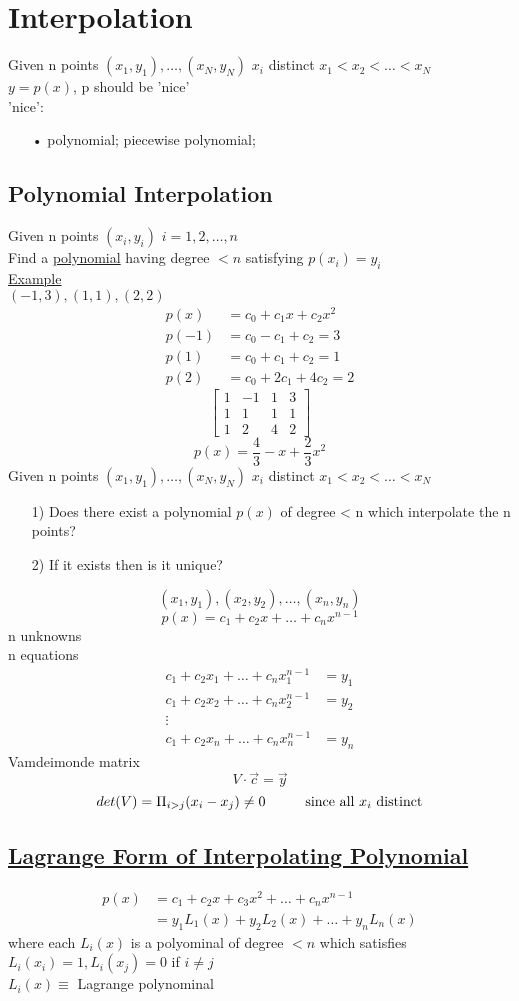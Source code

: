\documentclass[10pt,usletter]{article}
\newcommand{\tab}[1][1cm]{\hspace*{#1}}
\begin{document}
\section{Interpolation}
Given n points $(x_1, y_1),\hdots, (x_N, y_N)$ $x_i$ distinct $x_1<x_2<\hdots<x_N$ \\
$y=p(x)$, p should be 'nice'\\
'nice':
\begin{enumerate}
\item[•] polynomial; piecewise polynomial;
\end{enumerate}
\subsection{Polynomial Interpolation}
Given n points $(x_i, y_i)$  $i=1,2,\hdots,n$\\
Find a \underline{polynomial} having degree $<n$ satisfying $p(x_i)=y_i$\\
\underline{Example}\\
$(-1,3),(1,1), (2,2)$\\
\begin{align*}
p(x)&=c_0+c_1x+c_2x^2\\
p(-1)&=c_0-c_1+c_2=3\\
p(1)&=c_0+c_1+c_2=1\\
p(2)&=c_0+2c_1+4c_2=2
\end{align*}
$$
\begin{bmatrix}
1 & -1 & 1 & 3\\
1 & 1 & 1 & 1\\
1 & 2 & 4 & 2
\end{bmatrix}
$$
$$p(x)=\frac{4}{3} - x + \frac{2}{3}x^2$$
Given n points $(x_1, y_1),\hdots, (x_N, y_N)$ $x_i$ distinct $x_1<x_2<\hdots<x_N$ 
\begin{enumerate}
\item[1)] Does there exist a polynomial $p(x)$ of degree < n which interpolate the n points?
\item[2)] If it exists then is it unique?
\end{enumerate}
$$(x_1,y_1), (x_2,y_2), \dots, (x_n, y_n)$$
$$p(x)=c_1+c_2x+\hdots +c_nx^{n-1}$$
n unknowns\\
n equations
\begin{align*}
c_1+c_2x_1+\hdots +c_nx_1^{n-1}&=y_1\\
c_1+c_2x_2+\hdots +c_nx_2^{n-1}&=y_2\\
\vdots\\
c_1+c_2x_n+\hdots +c_nx_n^{n-1}&=y_n
\end{align*}
Vamdeimonde matrix
$$V \cdot\vec{c}=\vec{y}$$
$$det(V)=\Pi_{i>j}(x_i-x_j)\neq 0 \tab \text{since all $x_i$ distinct}$$
\subsection{\underline{Lagrange Form of Interpolating Polynomial}}
\begin{align*}
p(x)&=c_1+c_2x+c_3x^2+\hdots+c_nx^{n-1}\\
&=y_1L_1(x)+y_2L_2(x)+\hdots + y_nL_n(x)
\end{align*}
where each $L_i(x)$ is a polyominal of degree $<n$ which satisfies $L_i(x_i)=1, L_i(x_j)=0$ if $i \neq j$\\
$L_i(x)\equiv$ Lagrange polynominal
\end{document}
